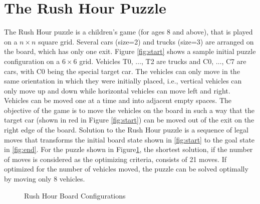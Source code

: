 \documentclass[doctor]{thesis} %
\theoremstyle{plain}
\begin{document}
\section*{The Rush Hour Puzzle}
\label{sec:rushhourpuzzle}
The Rush Hour puzzle is a children's game (for ages 8 and above), that is played on a $n \times n$ square grid. Several cars (size=2) and trucks (size=3) are arranged on the board, which has only one exit. Figure \ref{fig:start} shows a sample initial puzzle configuration on a $6 \times 6$ grid. Vehicles T0, $\ldots$, T2 are trucks and C0, $\ldots$, C7 are cars, with C0 being the special target car. The vehicles can only move in the same orientation in which they were initially placed, i.e., vertical vehicles can only move up and down while horizontal vehicles can move left and right. Vehicles can be moved one at a time and into adjacent empty spaces. The objective of the game is to move the vehicles on the board in such a way that the target car (shown in red in Figure \ref{fig:start}) can be moved out of the exit on the right edge of the board. Solution to the Rush Hour puzzle is a sequence of legal moves that transforms the initial board state shown in \ref{fig:start} to the goal state in \ref{fig:end}. For the puzzle shown in Figure\ref{fig:whole}, the shortest solution, if the number of moves is considered as the optimizing criteria, consists of 21 moves. If optimized for the number of vehicles moved, the puzzle can be solved optimally by moving only 8 vehicles. 
\begin{figure}[!pbt]
  \centering
  \hfill
  \caption{Rush Hour Board Configurations}
  \label{fig:whole}
\end{figure}
\end{document}
